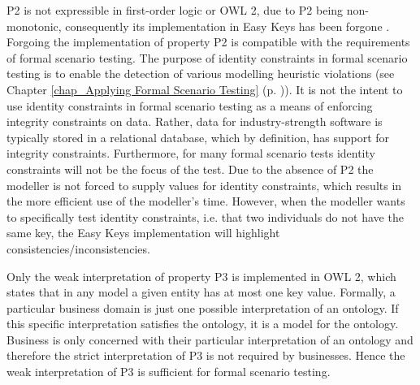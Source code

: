    P2 is not expressible in first-order logic or OWL 2, due to P2 being non-monotonic, consequently its implementation in Easy Keys has been forgone \cite{Parsia2008}.
   Forgoing the implementation of property P2 is compatible with the requirements of formal scenario testing. The purpose of identity constraints in formal scenario testing is to enable the detection of 
   various modelling heuristic violations (see Chapter \ref{chap_Applying Formal Scenario Testing} (p. \pageref{chap_Applying Formal Scenario Testing})). 
   It is not the intent to use identity constraints in formal scenario testing as a means of enforcing integrity constraints on data. Rather, 
   data for industry-strength software is typically stored in a relational database, which by definition, has support for integrity constraints. 
   Furthermore, for many formal scenario tests identity constraints will not be the focus of the test. Due to the absence of P2
   the modeller is not forced to supply values for identity constraints, which results in the more efficient use of the modeller's time. However, when the modeller wants to specifically test identity
   constraints, i.e. that two individuals do not have the same key, the Easy Keys implementation will highlight consistencies/inconsistencies.
   
   Only the weak interpretation of property P3 is implemented in OWL 2, which states that in any model a given entity has at most one key value. Formally, a particular business domain is just one possible
   interpretation of an ontology. If this specific interpretation satisfies the ontology, it is a model for the ontology. Business is only concerned with their particular interpretation of an ontology 
   and therefore the strict interpretation of P3 is not required by businesses. Hence the weak interpretation of P3 is sufficient for formal scenario testing.

